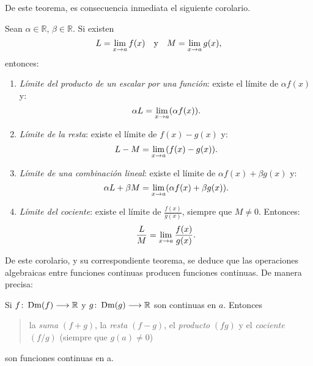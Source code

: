 De este teorema, es consecuencia inmediata el siguiente corolario.

\begin{corocal}\label{cor:limPropiedadesAlgebraicas}%
Sean $\alpha\in\mathbb{R}$, $\beta\in\mathbb{R}$. Si
existen
\[
L = \limjc{f(x)}{x}{a} \yjc M = \limjc{g(x)}{x}{a},
\]
entonces:
\begin{enumerate}
\item \emph{Límite del producto de un escalar por una función}: existe el límite de $\alpha
    f(x)$ y:
    \[
        \alpha L = \limjc{(\alpha f(x))}{x}{a}.
    \]
\item \emph{Límite de la resta}: existe el límite de $f(x) - g(x)$ y:
    \[
        L - M = \limjc{(f(x) - g(x))}{x}{a}.
    \]
\item \emph{Límite de una combinación lineal}: existe el límite de $\alpha f(x) + \beta g(x)$
    y:
    \[
        \alpha L + \beta M = \limjc{(\alpha f(x) + \beta g(x))}{x}{a}.
    \]
\item \emph{Límite del cociente}: existe el límite de $\frac{f(x)}{g(x)}$, siempre que $M\neq
    0$. Entonces:
    \[
        \frac{L}{M} = \limjc{\frac{f(x)}{g(x)}}{x}{a}.
    \]

\end{enumerate}
\end{corocal}

De este corolario, y su correspondiente teorema, se deduce que las operaciones algebraicas entre
funciones continuas producen funciones continuas. De manera precisa:

\begin{teocal}%
Si $\funcjc{f}{\Dm(f)}{\mathbb{R}}$ y $\funcjc{g}{\Dm(g)}{\mathbb{R}}$ son continuas en $a$.
Entonces
\begin{quote}
la \emph{suma} $(f + g)$, la \emph{resta} $(f - g)$, el \emph{producto} $(fg)$ y el \emph{cociente}
$(f/g)$ (siempre que $g(a) \neq 0$)
\end{quote}
son funciones continuas en a.
\end{teocal}

